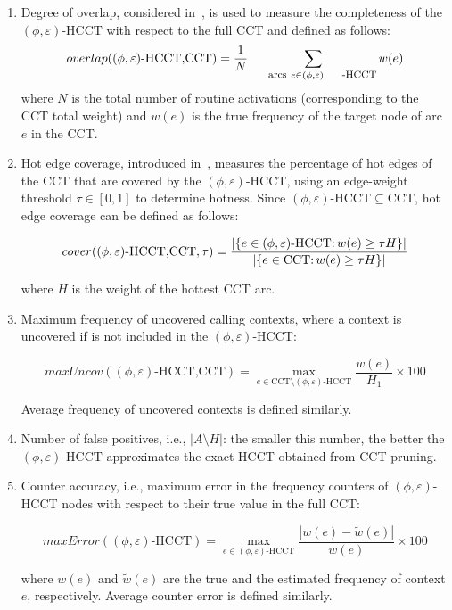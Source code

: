 \documentclass{sigplanconf}
\begin{document}
\begin{enumerate}

\item Degree of overlap, considered in~\cite{AR01, AS00, ZSCC06}, is used to measure the completeness of the $(\phi,\varepsilon)$-HCCT with respect to the full CCT and defined as follows:
$$overlap((\phi,\varepsilon){\mbox{-HCCT,CCT}})=\frac{1}{N}\sum_{\mbox{\footnotesize{arcs}}~e\in (\phi,\varepsilon)\mbox{\footnotesize{-HCCT}}}w(e)$$
where $N$ is the total number of routine activations (corresponding to the CCT total weight) and $w(e)$ is the true frequency of the target node of arc $e$ in the CCT.

\item Hot edge coverage, introduced in~\cite{ZSCC06}, measures the percentage of hot edges of the CCT that are covered by the $(\phi,\varepsilon)$-HCCT, using an edge-weight threshold $\tau\in [0,1]$ to determine hotness. Since $(\phi,\varepsilon)$-HCCT$\subseteq$CCT, hot edge coverage can be defined as follows:
\begin{small}
$$\hspace{-0mm}cover((\phi,\varepsilon){\mbox{-HCCT,CCT}},\tau)=\frac{|\{e\in(\phi,\varepsilon){\mbox{-HCCT:}}\,w(e)\ge\tau H\}|}{|\{e\in\mbox{CCT:}\,w(e)\ge\tau H\}|}$$
\end{small}
where $H$ is the weight of the hottest CCT arc.

\item Maximum frequency of uncovered calling contexts, where a context is uncovered if is not included in the $(\phi,\varepsilon)$-HCCT:
\begin{small}
$$maxUncov((\phi,\varepsilon){\mbox{-HCCT,CCT}})=\max_{e\in\mbox{CCT}\setminus(\phi,\varepsilon){\mbox{-HCCT}}}\frac{w(e)}{H_1}\times 100$$
\end{small}
Average frequency of uncovered contexts is defined similarly.

\item Number of false positives, i.e., $|A\setminus H|$: the smaller this number, the better the $(\phi,\varepsilon){\mbox{-HCCT}}$ approximates the exact HCCT obtained from CCT pruning.

\item Counter accuracy, i.e., maximum error in the frequency counters of $(\phi,\varepsilon)$-HCCT nodes with respect to their true value in the full CCT:
\begin{small}
$$maxError((\phi,\varepsilon){\mbox{-HCCT}})=\max_{e\in(\phi,\varepsilon){\mbox{-HCCT}}}\frac{|w(e)-\widetilde{w}(e)|}{w(e)}\times 100$$
\end{small}
where $w(e)$ and $\widetilde{w}(e)$ are the true and the estimated frequency of context $e$, respectively. Average counter error is defined similarly.

\end{enumerate}
\end{document}
